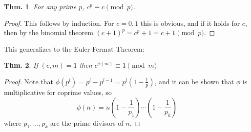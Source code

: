 \documentclass[12pt, a4paper]{book}
\newtheorem{theorem}{Thm.}[section]
\theoremstyle{nonumberplain}
\newtheorem{proof}{Proof}
\begin{document}
\begin{theorem}
    For any prime $p$, $c^p\equiv c\pmod{p}$.
\end{theorem}
\begin{proof}
    This follows by induction.
    For $c=0,1$ this is obvious, and if it holds for $c$, then by the binomial theorem $(c+1)^p=c^p+1=c+1\pmod{p}$.
\end{proof}
This generalizes to the Euler-Fermat Theorem:
\begin{theorem}
    If $(c,m)=1$ then $c^{\phi(m)}\equiv 1\pmod{m}$
\end{theorem}
\begin{proof}
    Note that $\phi(p^l)=p^l-p^{l-1}=p^l\left(1-\frac{1}{p}\right)$, and it can be shown that $\phi$ is multiplicative for coprime values, so
    \[\phi(n)=n\left(1-\frac{1}{p_1}\right)\cdots\left(1-\frac{1}{p_k}\right)\]
    where $p_1,\ldots,p_k$ are the prime divisors of $n$.
\end{proof}
\end{document}
